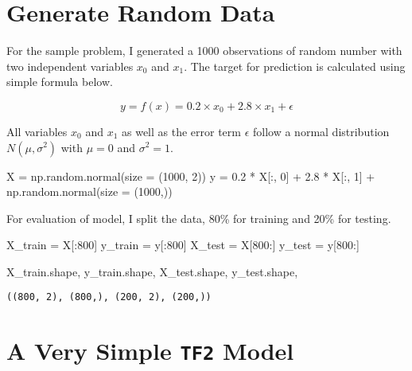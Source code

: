 \documentclass[
  letterpaper,
  DIV=11,
  numbers=noendperiod]{scrreprt}
\newenvironment{Shaded}{\begin{snugshade}}{\end{snugshade}}
\newcommand{\DecValTok}[1]{\textcolor[rgb]{0.68,0.00,0.00}{#1}}
\newcommand{\FloatTok}[1]{\textcolor[rgb]{0.68,0.00,0.00}{#1}}
\newcommand{\NormalTok}[1]{\textcolor[rgb]{0.00,0.23,0.31}{#1}}
\newcommand{\OperatorTok}[1]{\textcolor[rgb]{0.37,0.37,0.37}{#1}}
\begin{document}
\hypertarget{generate-random-data}{%
\section{Generate Random Data}\label{generate-random-data}}

For the sample problem, I generated a 1000 observations of random number
with two independent variables \(x_0\) and \(x_1\). The target for
prediction is calculated using simple formula below.

\[
    y = f(x) = 0.2 \times x_0 + 2.8 \times x_1 + \epsilon 
\]

All variables \(x_0\) and \(x_1\) as well as the error term \(\epsilon\)
follow a normal distribution \(N(\mu, \sigma^2)\) with \(\mu = 0\) and
\(\sigma^2 = 1\).

\begin{Shaded}
\begin{Highlighting}[]
\NormalTok{X }\OperatorTok{=}\NormalTok{ np.random.normal(size }\OperatorTok{=}\NormalTok{ (}\DecValTok{1000}\NormalTok{, }\DecValTok{2}\NormalTok{))}
\NormalTok{y }\OperatorTok{=} \FloatTok{0.2} \OperatorTok{*}\NormalTok{ X[:, }\DecValTok{0}\NormalTok{] }\OperatorTok{+} \FloatTok{2.8} \OperatorTok{*}\NormalTok{ X[:, }\DecValTok{1}\NormalTok{] }\OperatorTok{+}\NormalTok{ np.random.normal(size }\OperatorTok{=}\NormalTok{ (}\DecValTok{1000}\NormalTok{,))}
\end{Highlighting}
\end{Shaded}

For evaluation of model, I split the data, 80\% for training and 20\%
for testing.

\begin{Shaded}
\begin{Highlighting}[]
\NormalTok{X\_train }\OperatorTok{=}\NormalTok{ X[:}\DecValTok{800}\NormalTok{]}
\NormalTok{y\_train }\OperatorTok{=}\NormalTok{ y[:}\DecValTok{800}\NormalTok{]}
\NormalTok{X\_test }\OperatorTok{=}\NormalTok{ X[}\DecValTok{800}\NormalTok{:]}
\NormalTok{y\_test }\OperatorTok{=}\NormalTok{ y[}\DecValTok{800}\NormalTok{:]}

\NormalTok{X\_train.shape, y\_train.shape, X\_test.shape, y\_test.shape, }
\end{Highlighting}
\end{Shaded}

\begin{verbatim}
((800, 2), (800,), (200, 2), (200,))
\end{verbatim}

\hypertarget{a-very-simple-tf2-model}{%
\section{\texorpdfstring{A Very Simple \texttt{TF2}
Model}{A Very Simple TF2 Model}}\label{a-very-simple-tf2-model}}
\end{document}
